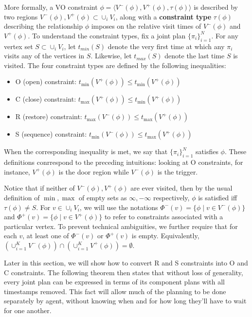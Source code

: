 \documentclass[letterpaper]{article}
\begin{document}
More formally, a VO constraint $\phi = \langle V^-(\phi),V^+(\phi),\tau(\phi)\rangle$ is described by two regions $V^-(\phi),V^+(\phi)\subset \cup_i V_i$, along with a \textbf{constraint type} $\tau(\phi)$ describing the relationship $\phi$ imposes on the relative visit times of $V^-(\phi)$ and $V^+(\phi)$. To understand the constraint types, fix a joint plan $\{\pi_i\}_{i=1}^N$. For any vertex set $S \subset \cup_i V_i$, let $t_{min}(S)$ denote the very first time at which any $\pi_i$ visits any of the vertices in $S$. Likewise, let $t_{max}(S)$ denote the last time $S$ is visited. The four constraint types are defined by the following inequalities:

\begin{itemize}
\item O (open) constraint: $t_{\min}(V^+(\phi)) \le t_{\min}(V^+(\phi))$
\item C (close) constraint: $t_{\max}(V^+(\phi)) \le t_{\min}(V^+(\phi))$
\item R (restore) constraint: $t_{\max}(V^-(\phi)) \le t_{\max}(V^+(\phi))$
\item S (sequence) constraint: $t_{\min}(V^-(\phi)) \le t_{\max}(V^+(\phi))$
\end{itemize}

When the corresponding inequality is met, we say that $\{\pi_i\}_{i=1}^N$ satisfies $\phi$. These definitions conrrespond to the preceding intuitions: looking at O constraints, for instance, $V^+(\phi)$ is the door region while $V^-(\phi)$ is the trigger.

Notice that if neither of $V^-(\phi),V^+(\phi)$ are ever visited, then by the usual definition of $\min,\max$ of empty sets as $\infty, -\infty$ respectively, $\phi$ is satisfied iff $\tau(\phi)\ne S$. For $v\in \cup_i V_i$, we will use the notations $\Phi^-(v) = \{\phi \mid v\in V^-(\phi)\}$ and $\Phi^+(v) = \{\phi \mid v\in V^+(\phi)\}$ to refer to constraints associated with a particular vertex. To prevent technical ambiguities, we further require that for each $v$, at least one of $\Phi^-(v)$ or $\Phi^+(v)$ is empty. Equivalently, $(\cup_{i=1}^K V^-(\phi)) \cap (\cup_{i=1}^K V^+(\phi)) = \emptyset$.

Later in this section, we will show how to convert R and S constraints into O and C constraints. The following theorem then states that without loss of generality, every joint plan can be expressed in terms of its component plans with all timestamps removed. This fact will allow much of the planning to be done separately by agent, without knowing when and for how long they'll have to wait for one another.
\end{document}
